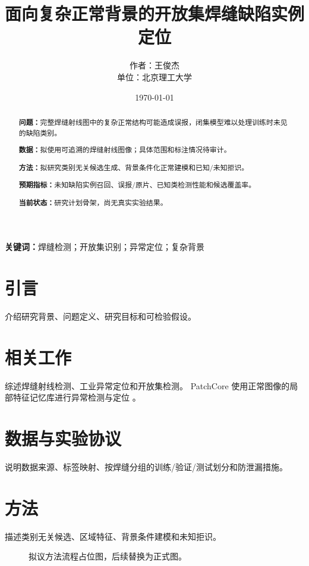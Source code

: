 \documentclass[UTF8,a4paper,12pt]{ctexart}
\title{面向复杂正常背景的开放集焊缝缺陷实例定位}
\author{作者：王俊杰\\单位：北京理工大学}
\date{\today}
\begin{document}
\maketitle

\begin{abstract}
\noindent\textbf{问题：}完整焊缝射线图中的复杂正常结构可能造成误报，闭集模型难以处理训练时未见的缺陷类别。

\noindent\textbf{数据：}拟使用可追溯的焊缝射线图像；具体范围和标注情况待审计。

\noindent\textbf{方法：}拟研究类别无关候选生成、背景条件化正常建模和已知/未知拒识。

\noindent\textbf{预期指标：}未知缺陷实例召回、误报/原片、已知类检测性能和候选覆盖率。

\noindent\textbf{当前状态：}研究计划骨架，尚无真实实验结果。
\end{abstract}

\noindent\textbf{关键词：}焊缝检测；开放集识别；异常定位；复杂背景

\section{引言}
介绍研究背景、问题定义、研究目标和可检验假设。

\section{相关工作}
综述焊缝射线检测、工业异常定位和开放集检测。
PatchCore 使用正常图像的局部特征记忆库进行异常检测与定位
\cite{roth2022patchcore}。

\section{数据与实验协议}
说明数据来源、标签映射、按焊缝分组的训练/验证/测试划分和防泄漏措施。

\section{方法}
描述类别无关候选、区域特征、背景条件建模和未知拒识。

\begin{figure}[htbp]
\centering
{}
\caption{拟议方法流程占位图，后续替换为正式图。}
\label{fig:framework}
\end{figure}
\end{document}

